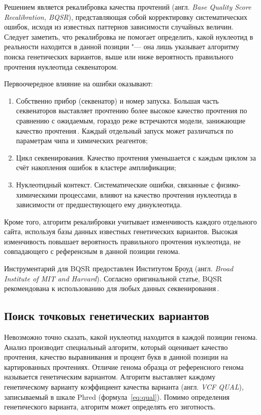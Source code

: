 \documentclass[12pt, twoside, a4paper]{article}
\newcommand{\engterm}[1]{англ. \textenglish{\textit{#1}}}
\newcommand{\formularef}[1]{формула~\ref{#1}}
\begin{document}
Решением является рекалибровка качества прочтений (\engterm{Base Quality Score Recalibration, BQSR}), представляющая собой корректировку систематических ошибок, исходя из известных паттернов зависимости случайных величин.
Следует заметить, что рекалибровка не помогает определить, какой нуклеотид в реальности находится в данной позиции "--- она лишь указывает алгоритму поиска генетических вариантов, выше или ниже вероятность правильного прочтения нуклеотида секвенатором.

Первоочередное влияние на ошибки оказывают:

\begin{enumerate}
	\item Собственно прибор (секвенатор) и номер запуска.
	      Большая часть секвенаторов выставляет прочтению более высокое качество прочтения по сравнению с ожидаемым, гораздо реже встречаются модели, занижающие качество прочтения\,\cite{Auwera_2013}.
	      Каждый отдельный запуск может различаться по параметрам чипа и химических реагентов;
	\item Цикл секвенирования.
	      Качество прочтения уменьшается с каждым циклом за счёт накопления ошибок в кластере амплификации;
	\item Нуклеотидный контекст.
	      Систематические ошибки, связанные с физико-химическими процессами, влияют на качество прочтения нуклеотида в зависимости от предшествующего ему динуклеотида.
\end{enumerate}

Кроме того, алгоритм рекалибровки учитывает изменчивость каждого отдельного сайта, используя базы данных известных генетических вариантов.
Высокая изменчивость повышает вероятность правильного прочтения нуклеотида, не совпадающего с референсным в данной позиции генома.

Инструментарий для BQSR предоставлен Институтом Броуд (\engterm{Broad Institute of MIT and Harvard}).
Согласно оригинальной статье, BQSR рекомендована к использованию для любых данных секвенирования\,\cite{Auwera_2013}.

\subsection*{Поиск точковых генетических вариантов}

Невозможно точно сказать, какой нуклеотид находится в каждой позиции генома.
Анализ производит специальный алгоритм, который оценивает качество прочтения, качество выравнивания и процент букв в данной позиции на картированных прочтениях.
Отличие генома образца от референсного генома называется генетическим вариантом.
Алгоритм выставляет каждому генетическому варианту коэффициент качества варианта (\engterm{VCF QUAL}), записываемый в шкале Phred (\formularef{eq:qual}).
Помимо определения генетического варианта, алгоритм может определять его зиготность.
\end{document}
